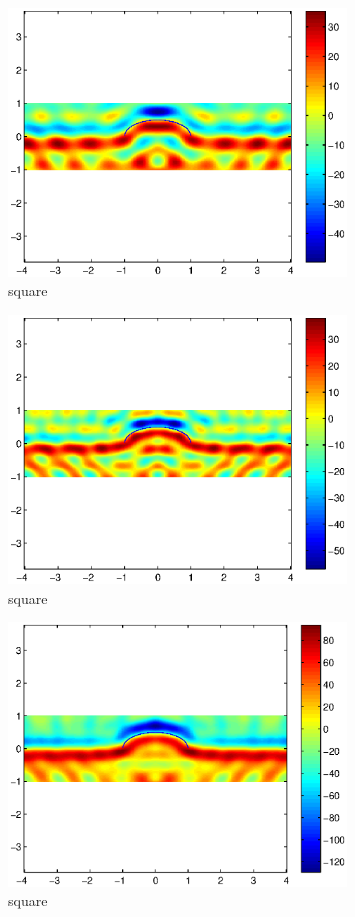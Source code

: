 \documentclass[12pt]{iopart}
\begin{document}
\begin{figure}
	\centering
	\includegraphics[width=0.8\textwidth]{./figure_rough/hemicircle_1point5}
	\caption{square}\label{I1}
\end{figure}
\begin{figure}
	\centering
	\includegraphics[width=0.8\textwidth]{./figure_rough/hemicircle_2}
	\caption{square}\label{I1}
\end{figure}
\begin{figure}
	\centering
	\includegraphics[width=0.8\textwidth]{./figure_rough/hemicircle_multi}
	\caption{square}\label{I1}
\end{figure}
\end{document}
